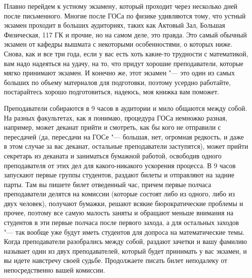 Плавно перейдем к устному экзамену, который проходит через несколько дней после письменного. Многие после ГОСа по физике удивляются тому, что устный экзамен проходит в больших аудиториях, таких как Актовый Зал, Большая Физическая, 117 ГК и прочие, но на самом деле, это правда. Это самый обычный экзамен от кафедры вышмата с некоторыми особенностями, о которых ниже. Снова, как и все три года, если у вас есть хоть какие-то трудности с математикой, вам надо надеяться на удачу, на то, что придут хорошие преподаватели, которые мягко принимают экзамен. И конечно же, этот экзамен "--- это один из самых больших по объему материалов для подготовки, поэтому усердно работайте, постарайтесь хорошо подготовиться, надеюсь, моя книжка вам поможет.

Преподаватели собираются в 9 часов в аудитории и мило общаются между собой. На разных факультетах, как я понимаю, процедура ГОСа немножко разная, например, может деканат прийти и смотреть, как бы кого не отправили с пересдачей (да, пересдачи на ГОСе "--- большая, нет, огромная редкость, и даже в этом случае за вас деканат, остальные преподаватели заступятся), может прийти секретарь из деканата и заниматься бумажной работой, освободив одного преподавателя от этих дел для какого-никакого ускорения процесса. В 9 часов запускают первые группы студентов, раздают билеты и отправляют на задние парты. Там вы пишете билет отведенный час, причем первые полчаса  преподаватели делятся на комиссии (которые состоят либо из одного, либо из двух человек), получают бумажки, решают всякие бюрократические проблемы и прочее, поэтому все самую малость заняты и обращают меньше внимания на студентов в эти первые полчаса после первого захода, а для остальных заходов "--- так вообще уже будут иметь студентов для допроса на математические темы. Когда преподаватели разобрались между собой, раздают зачетки и вашу фамилию называет один из двух преподавателей, который будет принимать у вас экзамен, и вы идете навстречу своей судьбе. Продолжаете писать билет неподалеку от  непосредственно вашей комиссии.

